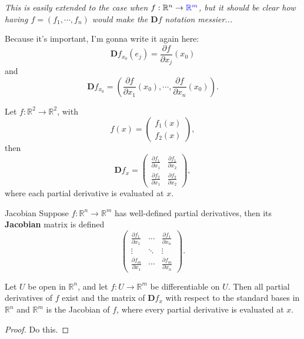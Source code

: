 \documentclass[10pt]{report}
\begin{document}
\textit{This is easily extended to the case when $f: \mathbb{R}^n \to {\color{blue}\mathbb{R}^m}$, but it should be clear how having $f=(f_1, \cdots, f_n)$ would make the $\mathbf{D}f$ notation messier...}

\begin{note}{}{}
Because it's important, I'm gonna write it again here:
\[
	\mathbf{D}f_{x_0}(e_j) = \frac{\partial f}{\partial x_j} (x_0)
\] 
and
\[
\mathbf{D}f_{x_0} = \left( \frac{\partial f}{\partial x_1} (x_0), \cdots, \frac{\partial f}{\partial x_n} (x_0) \right).
\] 
\end{note}

\begin{ex}{}{}
Let $f: \mathbb{R}^2 \to \mathbb{R}^2$, with
\[
	f(x) = 
	\begin{pmatrix}
		f_1(x) \\
		f_2(x)
	\end{pmatrix},
\] then
\[
\mathbf{D}f_{x} =
\begin{pmatrix}
	\frac{\partial f_1}{\partial x_1} & \frac{\partial f_1}{\partial x_2} \\
	\frac{\partial f_2}{\partial x_1} & \frac{\partial f_2}{\partial x_2}
\end{pmatrix},
\] where each partial derivative is evaluated at $x$.
\end{ex}

\begin{defn}{Jacobian}{}
Suppose $f:\mathbb{R}^n \to \mathbb{R}^m$ has well-defined partial derivatives, then its \textbf{Jacobian} matrix is defined
\[
\begin{pmatrix}
	\frac{\partial f_1}{\partial x_1} & \cdots & \frac{\partial f_1}{\partial x_n} \\
	\vdots & \ddots & \vdots \\
	\frac{\partial f_m}{\partial x_1} & \cdots & \frac{\partial f_m}{\partial x_n} 
\end{pmatrix}.
\] 
\end{defn}

\begin{thrm}{}{}
Let $U$ be open in $\mathbb{R}^n$, and let $f:U \to \mathbb{R}^m$ be differentiable on $U$. Then all partial derivatives of $f$ exist and the matrix of $\mathbf{D}f_{x}$ with respect to the standard bases in $\mathbb{R}^n$ and $\mathbb{R}^m$ is the Jacobian of $f$, where every partial derivative is evaluated at $x$.
\end{thrm}
\begin{proof}
	{\color{red}Do this.}
\end{proof}
\end{document}
